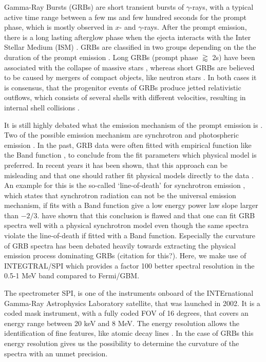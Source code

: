 \documentclass[twocolumn]{aa}
\begin{document}
Gamma-Ray Bursts (GRBs) are short transient bursts of $\gamma$-rays, with a typical active time range between a few ms and few hundred seconds for the prompt phase, which is mostly observed in $x$- and $\gamma$-rays. After the prompt emission, there is a long lasting afterglow phase when the ejecta interacts with the Inter Stellar Medium (ISM) \citep{afterglow}. GRBs are classified in two groups depending on the the duration of the prompt emission \citep{shortlong}. Long GRBs (prompt phase $\gtrapprox$ 2s) have been associated with the collapse of massive stars \citep{SN1, SN2}, whereas short GRBs are believed to be caused by mergers of compact objects, like neutron stars \citep{gw}. In both cases it is consensus, that the progenitor events of GRBs produce jetted relativistic outflows, which consists of several shells with different velocities, resulting in internal shell collisions \citep{gamma-ray-burst}.

It is still highly debated what the emission mechanism of the prompt emission is \citep[for a review see][]{gamma-ray-burst}. Two of the possible emission mechanism are synchrotron \citep[e.g.][]{syn_shell, bosnjak_syn, synch} and photospheric emission \citep[e.g.][]{photo_1, photo_2, photo_3}. In the past, GRB data were often fitted with empirical function like the Band function \citep{band}, to conclude from the fit parameters which physical model is preferred. In recent years it has been shown, that this approach can be misleading and that one should rather fit physical models directly to the data \citep{physical_models, synch}. An example for this is the so-called `line-of-death' for synchrotron emission \citep{line-of-death, line-of-death2}, which states that synchrotron radiation can not be the universal emission mechanism, if fits with a Band function give a low energy power law slope larger than $-2/3$. \citet{synch} have shown that this conclusion is flawed and that one can fit GRB spectra well with a physical synchrotron model even though the same spectra violate the line-of-death if fitted with a Band function. Especially the curvature of GRB spectra has been debated heavily towards extracting the physical emission process dominating GRBs (citation for this?). Here, we make use of INTEGTRAL/SPI which provides a factor 100 better spectral resolution in the 0.5-1 MeV band compared to Fermi/GBM.

The spectrometer SPI, is one of the instruments onboard of the INTErnational Gamma-Ray Astrophysics Laboratory \citep[INTEGRAL][]{integral} satellite, that was launched in 2002. It is a coded mask instrument, with a fully coded FOV of 16 degrees, that covers an energy range between 20 keV and 8 MeV. The energy resolution allows the identification of fine features, like atomic decay lines \citep{spi_main}. In the case of GRBs this energy resolution gives us the possibility to determine the curvature of the spectra with an unmet precision.
\end{document}
